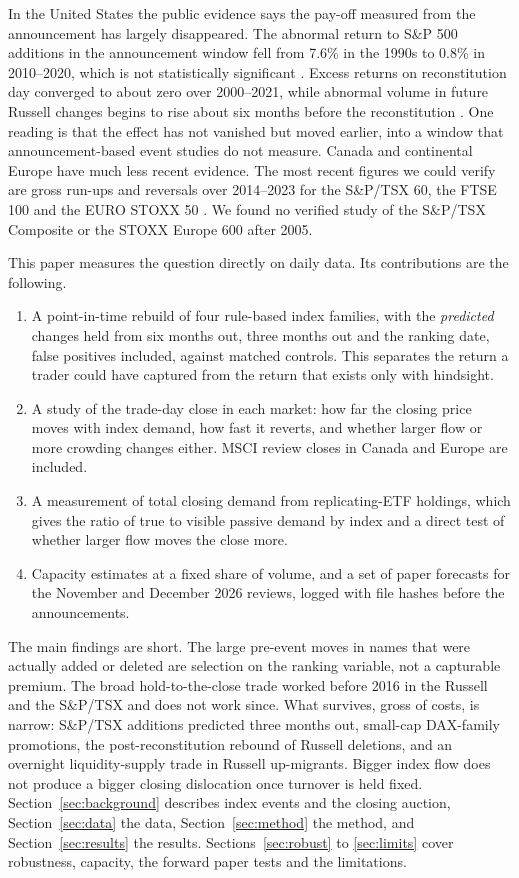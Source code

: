 \documentclass[10pt, a4paper, twocolumn]{article}
\begin{document}
In the United States the public evidence says the pay-off measured from the announcement has largely disappeared. The abnormal return to S\&P 500 additions in the announcement window fell from 7.6\% in the 1990s to 0.8\% in 2010--2020, which is not statistically significant \cite{greenwood2025}. Excess returns on reconstitution day converged to about zero over 2000--2021, while abnormal volume in future Russell changes begins to rise about six months before the reconstitution \cite{chinco2024}. One reading is that the effect has not vanished but moved earlier, into a window that announcement-based event studies do not measure. Canada and continental Europe have much less recent evidence. The most recent figures we could verify are gross run-ups and reversals over 2014--2023 for the S\&P/TSX 60, the FTSE 100 and the EURO STOXX 50 \cite{dfa2025}. We found no verified study of the S\&P/TSX Composite or the STOXX Europe 600 after 2005.

This paper measures the question directly on daily data. Its contributions are the following.
\begin{enumerate}[nosep,leftmargin=*]
\item A point-in-time rebuild of four rule-based index families, with the \emph{predicted} changes held from six months out, three months out and the ranking date, false positives included, against matched controls. This separates the return a trader could have captured from the return that exists only with hindsight.
\item A study of the trade-day close in each market: how far the closing price moves with index demand, how fast it reverts, and whether larger flow or more crowding changes either. MSCI review closes in Canada and Europe are included.
\item A measurement of total closing demand from replicating-ETF holdings, which gives the ratio of true to visible passive demand by index and a direct test of whether larger flow moves the close more.
\item Capacity estimates at a fixed share of volume, and a set of paper forecasts for the November and December 2026 reviews, logged with file hashes before the announcements.
\end{enumerate}

The main findings are short. The large pre-event moves in names that were actually added or deleted are selection on the ranking variable, not a capturable premium. The broad hold-to-the-close trade worked before 2016 in the Russell and the S\&P/TSX and does not work since. What survives, gross of costs, is narrow: S\&P/TSX additions predicted three months out, small-cap DAX-family promotions, the post-reconstitution rebound of Russell deletions, and an overnight liquidity-supply trade in Russell up-migrants. Bigger index flow does not produce a bigger closing dislocation once turnover is held fixed. Section~\ref{sec:background} describes index events and the closing auction, Section~\ref{sec:data} the data, Section~\ref{sec:method} the method, and Section~\ref{sec:results} the results. Sections~\ref{sec:robust} to \ref{sec:limits} cover robustness, capacity, the forward paper tests and the limitations.
\end{document}
